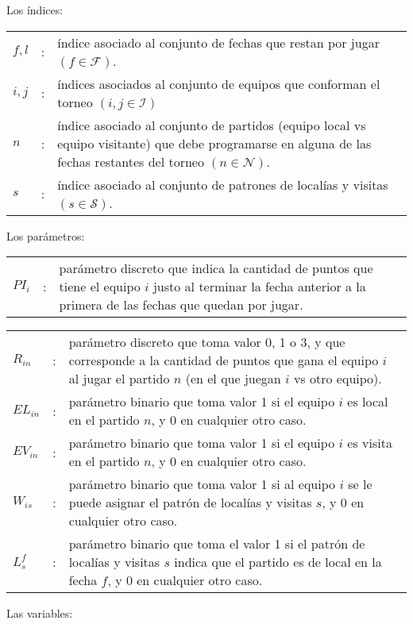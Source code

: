 \documentclass[authoryear,preprint,review,12pts]{elsarticle}
\begin{document}
\vspace{0.05in} Los índices:

\begin{tabular}{p{0.79cm}cp{13.5cm}}
$f,l$   & : & índice asociado al conjunto de fechas que restan por jugar $(f \in \mathcal{F})$.\\
$i,j$   & : & índices asociados al conjunto de equipos que conforman el torneo $(i,j \in \mathcal{I})$\\
$n$     & : & índice asociado al conjunto de partidos (equipo local vs equipo visitante) que debe programarse en alguna de las fechas restantes del torneo $(n \in \mathcal{N})$.\\
$s$     & : & índice asociado al conjunto de patrones de localías y visitas $(s \in \mathcal{S})$.
\end{tabular}

\vspace{0.05in} Los parámetros:

\begin{tabular}{p{0.79cm}cp{13.5cm}}
$PI_i$    & : & parámetro discreto que indica la cantidad de puntos que tiene el equipo $i$ justo al terminar la fecha anterior a la primera de las fechas que quedan por jugar.\\
\end{tabular}
\begin{tabular}{p{0.79cm}cp{13.5cm}}
$R_{in}$    & : & parámetro discreto que toma valor 0, 1 o 3, y que corresponde a la cantidad de puntos que gana el equipo $i$ al jugar el partido $n$ (en el que juegan $i$ vs otro equipo).\\
$EL_{in}$   & : & parámetro binario que toma valor 1 si el equipo $i$ es local en el partido $n$, y 0 en cualquier otro caso.\\
$EV_{in}$   & : & parámetro binario que toma valor 1 si el equipo $i$ es visita en el partido $n$, y 0 en cualquier otro caso.\\
$W_{is}$    & : & parámetro binario que toma valor 1 si al equipo $i$ se le puede asignar el patrón de localías y visitas $s$, y 0 en cualquier otro caso.\\
$L_{s}^f$   & : & parámetro binario que toma el valor 1 si el patrón de localías y visitas $s$ indica que el partido es de local en la fecha $f$, y 0 en cualquier otro caso.
\end{tabular}

\vspace{0.05in}

Las variables:
\end{document}
